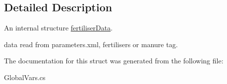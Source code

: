 \subsection{Detailed Description}
An internal structure \mbox{\hyperlink{struct_global_vars_1_1zone_specific_data_1_1fertiliser_data}{fertiliser\+Data}}. 

data read from parameters.\+xml, fertilisers or manure tag. 

The documentation for this struct was generated from the following file\+:\begin{DoxyCompactItemize}
\item 
Global\+Vars.\+cs\end{DoxyCompactItemize}
